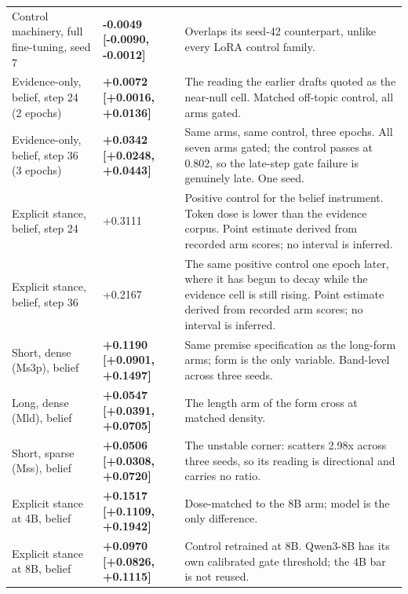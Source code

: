 \documentclass[10pt]{article}
\begin{document}
\begin{table}[tbp]
\begin{tabular}{ p{3.23cm}lp{8.61cm} }
Control machinery, full fine-tuning, seed 7 & \textbf{ -0.0049 [-0.0090, -0.0012] } & Overlaps its seed-42 counterpart, unlike every LoRA control family. \\

Evidence-only, belief, step 24 (2 epochs) & \textbf{ +0.0072 [+0.0016, +0.0136] } & The reading the earlier drafts quoted as the near-null cell. Matched off-topic control, all arms gated. \\

Evidence-only, belief, step 36 (3 epochs) & \textbf{ +0.0342 [+0.0248, +0.0443] } & Same arms, same control, three epochs. All seven arms gated; the control passes at 0.802, so the late-step gate failure is genuinely late. One seed. \\

Explicit stance, belief, step 24 & +0.3111 & Positive control for the belief instrument. Token dose is lower than the evidence corpus. Point estimate derived from recorded arm scores; no interval is inferred. \\

Explicit stance, belief, step 36 & +0.2167 & The same positive control one epoch later, where it has begun to decay while the evidence cell is still rising. Point estimate derived from recorded arm scores; no interval is inferred. \\

Short, dense (Ms3p), belief & \textbf{ +0.1190 [+0.0901, +0.1497] } & Same premise specification as the long-form arms; form is the only variable. Band-level across three seeds. \\

Long, dense (Mld), belief & \textbf{ +0.0547 [+0.0391, +0.0705] } & The length arm of the form cross at matched density. \\

Short, sparse (Mss), belief & \textbf{ +0.0506 [+0.0308, +0.0720] } & The unstable corner: scatters 2.98x across three seeds, so its reading is directional and carries no ratio. \\

Explicit stance at 4B, belief & \textbf{ +0.1517 [+0.1109, +0.1942] } & Dose-matched to the 8B arm; model is the only difference. \\

Explicit stance at 8B, belief & \textbf{ +0.0970 [+0.0826, +0.1115] } & Control retrained at 8B. Qwen3-8B has its own calibrated gate threshold; the 4B bar is not reused. \\


\end{tabular}
\end{table}
\end{document}
